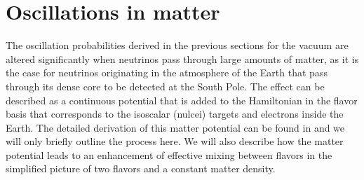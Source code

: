 \section{Oscillations in matter}
The oscillation probabilities derived in the previous sections for the vacuum are altered significantly when neutrinos pass through large amounts of matter, as it is the case for neutrinos originating in the atmosphere of the Earth that pass through its dense core to be detected at the South Pole. The effect can be described as a continuous potential that is added to the Hamiltonian in the flavor basis that corresponds to the isoscalar (nulcei) targets and electrons inside the Earth. The detailed derivation of this matter potential can be found in  and we will only briefly outline the process here. We will also describe how the matter potential leads to an enhancement of effective mixing between flavors in the simplified picture of two flavors and a constant matter density.

